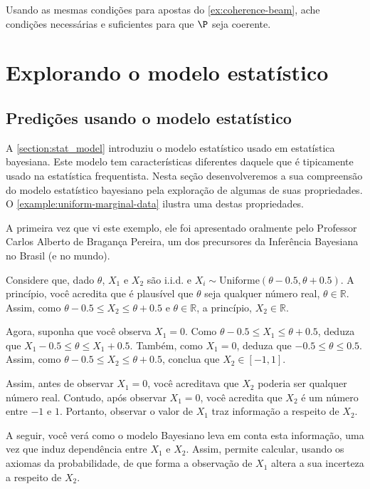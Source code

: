 \begin{exercise}[Desafio]
 Usando as mesmas condições 
 para apostas do \cref{ex:coherence-beam},
 ache condições necessárias e suficientes para que 
 $\P$ seja coerente.
\end{exercise}


\section{Explorando o modelo estatístico}
\subsection{Predições usando o modelo estatístico}

A \cref{section:stat_model} introduziu 
o modelo estatístico usado em estatística bayesiana.
Este modelo tem características diferentes daquele que 
é tipicamente usado na estatística frequentista.
Nesta seção desenvolveremos a sua compreensão do
modelo estatístico bayesiano pela 
exploração de algumas de suas propriedades.
O \cref{example:uniform-marginal-data} ilustra uma
destas propriedades.

\begin{example}
 \label{example:uniform-marginal-data}
 A primeira vez que vi este exemplo, ele foi 
 apresentado oralmente pelo 
 Professor Carlos Alberto de Bragança Pereira, um 
 dos precursores da Inferência Bayesiana no Brasil 
 (e no mundo).

 Considere que, dado $\theta$, 
 $X_{1}$ e $X_{2}$ são i.i.d. e
 $X_{i} \sim \text{Uniforme}(\theta-0.5,\theta+0.5)$.
 A princípio, você acredita que é plausível que 
 $\theta$ seja qualquer número real, 
 $\theta \in \mathbb{R}$.
 Assim, como $\theta-0.5 \leq X_{2} \leq \theta+0.5$ e 
 $\theta \in \mathbb{R}$,
 a princípio, $X_{2} \in \mathbb{R}$.
 
 Agora, suponha que você observa $X_{1}=0$. 
 Como $\theta-0.5 \leq X_{1} \leq \theta+0.5$,
 deduza que 
 $X_{1}-0.5 \leq \theta \leq X_{1}+0.5$.
 Também, como $X_{1}=0$, deduza que 
 $-0.5 \leq \theta \leq 0.5$.
 Assim, como $\theta-0.5 \leq X_{2} \leq \theta + 0.5$,
 conclua que $X_{2} \in [-1,1]$.

 Assim, antes de observar $X_{1}=0$, você 
 acreditava que $X_{2}$ poderia ser 
 qualquer número real. 
 Contudo, após observar $X_{1}=0$, 
 você acredita que $X_{2}$ é um 
 número entre $-1$ e $1$.
 Portanto, observar o valor de $X_{1}$ traz 
 informação a respeito de $X_{2}$.
 
 A seguir, você verá como o modelo Bayesiano
 leva em conta esta informação,
 uma vez que induz dependência
 entre $X_{1}$ e $X_{2}$.
 Assim, permite calcular,
 usando os axiomas da probabilidade,
 de que forma a observação de $X_{1}$ altera a 
 sua incerteza a respeito de $X_{2}$.
\end{example}


